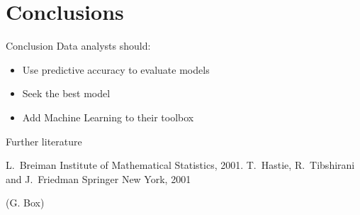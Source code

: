 \documentclass[compress]{beamer}
\begin{document}
\section{Conclusions}
\begin{frame}{Conclusion}
Data analysts should:
  \begin{itemize}
  \item Use predictive accuracy to evaluate models
  \item Seek the best model
  \item Add Machine Learning to their toolbox
  \end{itemize}
\end{frame}


\begin{frame}{Further literature}

  \begin{thebibliography}{10}
    \beamertemplatearticlebibitems
    L.~Breiman
    \newblock Institute of Mathematical Statistics, 2001.
    \beamertemplatebookbibitems
    T.~Hastie, R.~Tibshirani and J.~Friedman
    \newblock Springer New York, 2001
  \end{thebibliography}
\end{frame}


\begin{frame}[plain]
  \addtocounter{framenumber}{-1}
   (G. Box)
\end{frame}
\end{document}
